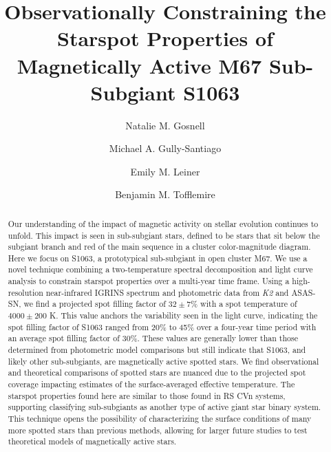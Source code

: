 \documentclass[twocolumn,tighten]{aastex631}
\begin{document}

\title{Observationally Constraining the Starspot Properties of Magnetically Active M67 Sub-Subgiant S1063}

\author[0000-0002-8443-0723]{Natalie M. Gosnell}

\author[0000-0002-4020-3457]{Michael A. Gully-Santiago}

\author[0000-0002-3944-8406]{Emily M. Leiner}

\author[0000-0003-2053-0749]{Benjamin M. Tofflemire}


\begin{abstract}

Our understanding of the impact of magnetic activity on stellar evolution continues to unfold. This impact is seen in sub-subgiant stars, defined to be stars that sit below the subgiant branch and red of the main sequence in a cluster color-magnitude diagram. Here we focus on S1063, a prototypical sub-subgiant in open cluster M67. We use a novel technique combining a two-temperature spectral decomposition and light curve analysis to constrain starspot properties over a multi-year time frame. Using a high-resolution near-infrared IGRINS spectrum and photometric data from \emph{K2} and ASAS-SN, we find a projected spot filling factor of $32\pm7$\% with a spot temperature of $4000\pm200$ K. This value anchors the variability seen in the light curve, indicating the spot filling factor of S1063 ranged from 20\% to 45\% over a four-year time period with an average spot filling factor of 30\%. These values are generally lower than those determined from photometric model comparisons but still indicate that S1063, and likely other sub-subgiants, are magnetically active spotted stars. We find observational and theoretical comparisons of spotted stars are nuanced due to the projected spot coverage impacting estimates of the surface-averaged effective temperature. The starspot properties found here are similar to those found in RS CVn systems, supporting classifying sub-subgiants as another type of active giant star binary system. This technique opens the possibility of characterizing the surface conditions of many more spotted stars than previous methods, allowing for larger future studies to test theoretical models of magnetically active stars. 

\end{abstract}
\end{document}
